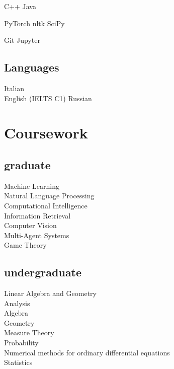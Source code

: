 \documentclass[a4paper]{deedy-resume} %
\begin{document}
\begin{minipage}[t]{0.33\textwidth}
C++ \textbullet{} Java

PyTorch \textbullet nltk \textbullet SciPy

Git \textbullet Jupyter

\sectionspace %

\subsection{Languages}

Italian \\

English (IELTS C1) \textbullet{} Russian \\

\sectionspace %


\section{Coursework}

\subsection{graduate}
Machine Learning\\
Natural Language Processing\\
Computational Intelligence\\
Information Retrieval\\
Computer Vision\\
Multi-Agent Systems\\
Game Theory

\sectionspace

\subsection{undergraduate}
Linear Algebra and Geometry\\
Analysis\\
Algebra\\ 
Geometry\\
Measure Theory\\
Probability\\
Numerical methods for ordinary differential equations\\
Statistics


\end{minipage} %
\end{document}
